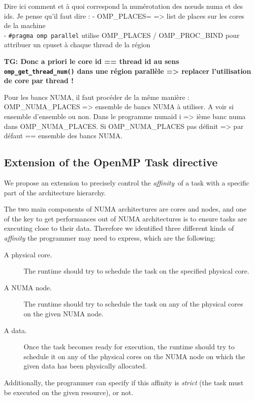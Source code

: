\documentclass{Styles/llncs}
\newcommand{\TG}[1]{{\color{red}\bfseries TG: #1}}
\begin{document}
Dire ici comment et à quoi correspond la numérotation des nœuds numa et des ids.
Je pense qu'il faut dire :
- OMP\_PLACES= => list de places sur les cores de la machine\\
- \texttt{#pragma omp parallel} utilise OMP\_PLACES / OMP\_PROC\_BIND pour attribuer un cpuset à chaque thread de la région

\TG{Donc a priori le core id == thread id au sens \texttt{omp\_get\_thread\_num()} dans une région parallèle => replacer l'utilisation de core par thread !}

Pour les bancs NUMA, il faut procéder de la même manière : 
OMP\_NUMA\_PLACES => ensemble de bancs NUMA à utiliser. A voir si ensemble d'ensemble ou non.
Dans le programme numaid i => ième banc numa dans OMP\_NUMA\_PLACES.
Si OMP\_NUMA\_PLACES pas définit => par défaut == ensemble des bancs NUMA.

\subsection{Extension of the OpenMP Task directive}

We propose an extension to precisely control the \emph{affinity} of a task with a specific part of the architecture hierarchy.

The two main components of NUMA architectures are cores and nodes, and one of
the key to get performances out of NUMA architectures is to ensure tasks are
executing close to their data.
Therefore we identified three different kinds of \emph{affinity} the programmer
may need to express, which are the following:
\begin{description}
    \item [A physical core.]
      The runtime should try to schedule the task on the specified physical core.

    \item [A NUMA node.]
      The runtime should try to schedule the task on any of the physical cores on
      the given NUMA node.

    \item [A data.]
      Once the task becomes ready for execution, the runtime should try to schedule it on any of the physical cores on
      the NUMA node on which the given data has been physically allocated.
\end{description}

Additionally, the programmer can specify if this affinity is \emph{strict} (the task must be executed on the given resource), or not.
\end{document}
